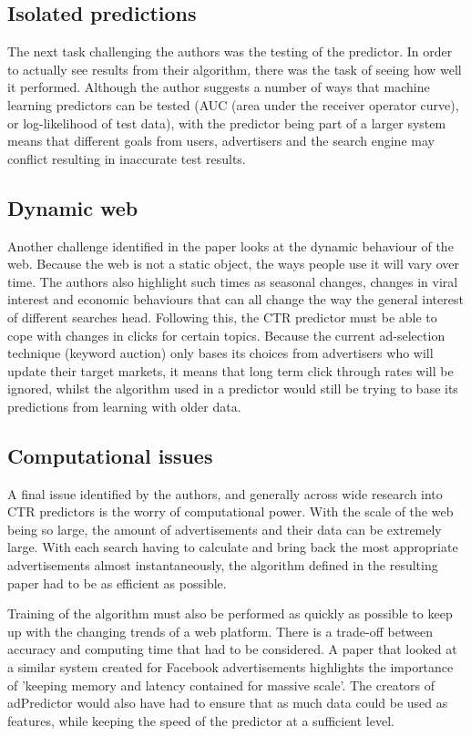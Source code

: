 \documentclass[journal]{IEEEtran}
\begin{document}
\subsection{Isolated predictions}
The next task challenging the authors was the testing of the predictor. In order to actually see results from their algorithm, there was the task of seeing how well it performed. Although the author suggests a number of ways that machine learning predictors can be tested (AUC (area under the receiver operator curve), or log-likelihood of test data), with the predictor being part of a larger system means that different goals from users, advertisers and the search engine may conflict resulting in inaccurate test results.

\subsection{Dynamic web}
Another challenge identified in the paper looks at the dynamic behaviour of the web. Because the web is not a static object, the ways people use it will vary over time. The authors also highlight such times as seasonal changes, changes in viral interest and economic behaviours that can all change the way the general interest of different searches head. Following this, the CTR predictor must be able to cope with changes in clicks for certain topics. Because the current ad-selection technique (keyword auction) only bases its choices from advertisers who will update their target markets, it means that long term click through rates will be ignored, whilst the algorithm used in a predictor would still be trying to base its predictions from learning with older data.

\subsection{Computational issues}
A final issue identified by the authors, and generally across wide research into CTR predictors is the worry of computational power. With the scale of the web being so large, the amount of advertisements and their data can be extremely large. With each search having to calculate and bring back the most appropriate advertisements almost instantaneously, the algorithm defined in the resulting paper had to be as efficient as possible. \par
Training of the algorithm must also be performed as quickly as possible to keep up with the changing trends of a web platform. There is a trade-off between accuracy and computing time that had to be considered. A paper that looked at a similar system created for Facebook advertisements \cite{facebook} highlights the importance of 'keeping memory and latency contained for massive scale'. The creators of adPredictor would also have had to ensure that as much data could be used as features, while keeping the speed of the predictor at a sufficient level.
\end{document}
